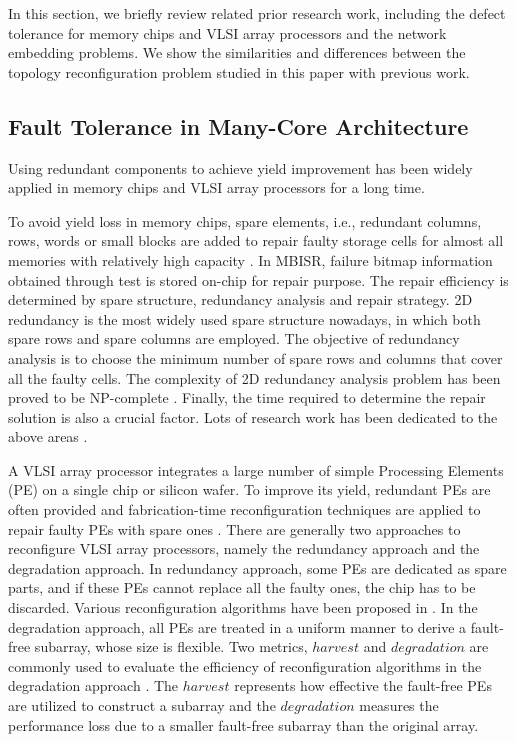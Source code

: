 In this section, we briefly review related prior research work, including the defect tolerance for memory chips and VLSI array processors and the network embedding problems. We show the similarities and differences between the topology reconfiguration problem studied in this paper with previous work.

\subsection{Fault Tolerance in Many-Core Architecture}
Using redundant components to achieve yield improvement has been widely applied in memory chips and VLSI array processors for a long time.

To avoid yield loss in memory chips, spare elements, i.e., redundant columns, rows, words or small blocks are added to repair faulty storage cells for almost all memories with relatively high capacity \cite{wang2006vlsi}. In MBISR, failure bitmap information obtained through test is stored on-chip for repair purpose. The repair efficiency is determined by spare structure, redundancy analysis and repair strategy. 2D redundancy is the most widely used spare structure nowadays, in which both spare rows and spare columns are employed. The objective of redundancy analysis is to choose the minimum number of spare rows and columns that cover all the faulty cells. The complexity of 2D redundancy analysis problem has been proved to be NP-complete \cite{kuo1987efficient}. Finally, the time required to determine the repair solution is also a crucial factor. Lots of research work has been dedicated to the above areas \cite{bhavsar1999algorithm,kawagoe2000built, du2004speed,huang2003built,lu2006efficient}.

A VLSI array processor integrates a large number of simple Processing Elements (PE) on a single chip or silicon wafer. To improve its yield, redundant PEs are often provided and fabrication-time reconfiguration techniques are applied to repair faulty PEs with spare ones \cite{jain1991fault}. There are generally two approaches to reconfigure VLSI array processors, namely the redundancy approach and the degradation approach. In redundancy approach, some PEs are dedicated as spare parts, and if these PEs cannot replace all the faulty ones, the chip has to be discarded. Various reconfiguration algorithms have been proposed in \cite{kung1989fault,kim1993rule,varvarigou1993reconfiguring,chen1997comprehensive}. In the degradation approach, all PEs are treated in a uniform manner to derive a fault-free subarray, whose size is flexible. Two metrics, $harvest$ and $degradation$ are commonly used to evaluate the efficiency of reconfiguration algorithms in the degradation approach \cite{low2000efficient,jigang2003improved,fukushi2005genetic}. The $harvest$ represents how effective the fault-free PEs are utilized to construct a subarray and the $degradation$ measures the performance loss due to a smaller fault-free subarray than the original array. 

